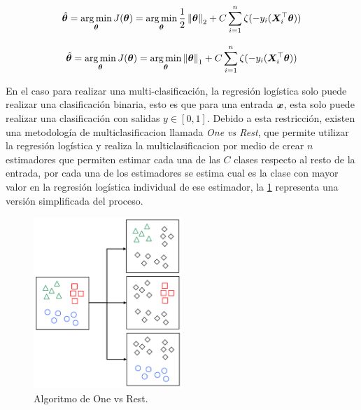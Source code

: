 \begin{equation} \label{eq:ovr-reg-l2costfunc}
  \hat{{\bm{\theta}}} = \operatorname*{arg\,min}_{{\bm{\theta}}} J({\bm{\theta}}) = \operatorname*{arg\,min}_{{\bm{\theta}}} \frac{1}{2}\left\lVert{\bm{\theta}}\right\rVert_2 + C \sum_{i=1}^n \zeta(- y_i ({\bm{X}}_i^{\top} {\bm{\theta}}))
\end{equation}

\begin{equation} \label{eq:ovr-reg-l1costfunc}
  \hat{{\bm{\theta}}} = \operatorname*{arg\,min}_{{\bm{\theta}}} J({\bm{\theta}}) = \operatorname*{arg\,min}_{{\bm{\theta}}} \left\lVert{\bm{\theta}}\right\rVert_1 + C \sum_{i=1}^n \zeta(- y_i ({\bm{X}}_i^{\top} {\bm{\theta}}))
\end{equation}

En el caso para realizar una multi-clasificación, la regresión logística solo puede realizar una clasificación binaria, esto es que para una entrada ${\bm{x}}$, esta solo puede realizar una clasificación con salidas $y \in [0, 1]$. Debido a esta restricción, existen una metodología de multiclasificacion llamada \emph{One vs Rest}, que permite utilizar la regresión logística y realiza la multiclasificacion por medio de crear $n$ estimadores que permiten estimar cada una de las $C$ clases respecto al resto de la entrada, por cada una de los estimadores se estima cual es la clase con mayor valor en la regresión logística individual de ese estimador, la \cref{fig:ovr-algo} representa una versión simplificada del proceso.

\begin{figure}[H]
  \centering
  \includegraphics[width=0.5\textwidth]{Figures/one-vs-rest.pdf}
\decoRule
\caption[Algoritmo de One vs Rest]{Algoritmo de One vs Rest.}
\label{fig:ovr-algo}
\end{figure}

